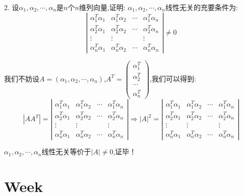 2. 设$\alpha_{1},\alpha_{2},\cdots,\alpha_{n}$是$n$个$n$维列向量,证明: $\alpha_{1},\alpha_{2},\cdots,\alpha_{n}$线性无关的充要条件为: $$\left| \begin{matrix}
	\alpha_{1}^{T}\alpha_{1}&\alpha_{1}^{T}\alpha_{2}&\cdots&\alpha_{1}^{T}\alpha_{n}\\\alpha_{2}^{T}\alpha_{1}&\alpha_{2}^{T}\alpha_{2}&\cdots&\alpha_{2}^{T}\alpha_{n}\\\vdots&\vdots& &\vdots\\\alpha_{n}^{T}\alpha_{1}&\alpha_{n}^{T}\alpha_{2}&\cdots&\alpha_{n}^{T}\alpha_{n}
\end{matrix}\right|\neq 0$$
\begin{solution}
	
	我们不妨设$A=(\alpha_{1},\alpha_{2},\cdots,\alpha_{n})$,$A^{T}=\left( \begin{matrix}
		\alpha_{1}^{T}\\\alpha_{2}^{T}\\\cdots\\\alpha_{n}^{T}
	\end{matrix}\right) $,我们可以得到: 
	$$|AA^{T}|=\left| \begin{matrix}
		\alpha_{1}^{T}\alpha_{1}&\alpha_{1}^{T}\alpha_{2}&\cdots&\alpha_{1}^{T}\alpha_{n}\\\alpha_{2}^{T}\alpha_{1}&\alpha_{2}^{T}\alpha_{2}&\cdots&\alpha_{2}^{T}\alpha_{n}\\\vdots&\vdots& &\vdots\\\alpha_{n}^{T}\alpha_{1}&\alpha_{n}^{T}\alpha_{2}&\cdots&\alpha_{n}^{T}\alpha_{n}
	\end{matrix}\right|\Rightarrow |A|^2=\left| \begin{matrix}
		\alpha_{1}^{T}\alpha_{1}&\alpha_{1}^{T}\alpha_{2}&\cdots&\alpha_{1}^{T}\alpha_{n}\\\alpha_{2}^{T}\alpha_{1}&\alpha_{2}^{T}\alpha_{2}&\cdots&\alpha_{2}^{T}\alpha_{n}\\\vdots&\vdots& &\vdots\\\alpha_{n}^{T}\alpha_{1}&\alpha_{n}^{T}\alpha_{2}&\cdots&\alpha_{n}^{T}\alpha_{n}
	\end{matrix}\right|$$
	
	$\alpha_{1},\alpha_{2},\cdots,\alpha_{n}$线性无关等价于$|A|\neq 0$,证毕！
\end{solution}

\section{Week }

